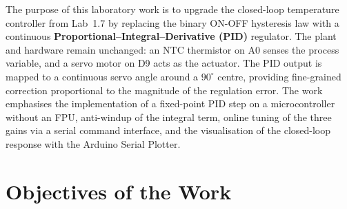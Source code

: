 \documentclass[12pt]{article}
\begin{document}
The purpose of this laboratory work is to upgrade the closed-loop temperature controller from Lab~1.7 by replacing the binary ON-OFF hysteresis law with a continuous \textbf{Proportional--Integral--Derivative (PID)} regulator. The plant and hardware remain unchanged: an NTC thermistor on A0 senses the process variable, and a servo motor on D9 acts as the actuator. The PID output is mapped to a continuous servo angle around a $90^{\circ}$ centre, providing fine-grained correction proportional to the magnitude of the regulation error. The work emphasises the implementation of a fixed-point PID step on a microcontroller without an FPU, anti-windup of the integral term, online tuning of the three gains via a serial command interface, and the visualisation of the closed-loop response with the Arduino Serial Plotter.

\section{Objectives of the Work}
\end{document}
